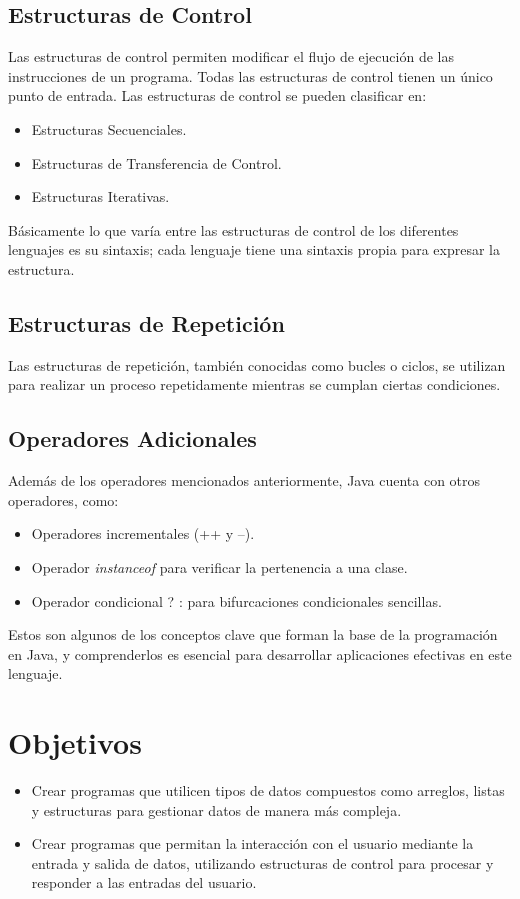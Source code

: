 \documentclass[11pt, twocolumn]{article}
\begin{document}
  \subsection*{Estructuras de Control}
  Las estructuras de control permiten modificar el flujo de ejecución de las instrucciones de un programa. Todas las estructuras de control tienen un único punto de entrada. Las estructuras de control se pueden clasificar en:

  \begin{itemize}
    \item Estructuras Secuenciales.
    \item Estructuras de Transferencia de Control.
    \item Estructuras Iterativas.
  \end{itemize}

  Básicamente lo que varía entre las estructuras de control de los diferentes lenguajes es su sintaxis; cada lenguaje tiene una sintaxis propia para expresar la estructura.

  \subsection*{Estructuras de Repetición}
  Las estructuras de repetición, también conocidas como bucles o ciclos, se utilizan para realizar un proceso repetidamente mientras se cumplan ciertas condiciones.

  \subsection*{Operadores Adicionales}
  Además de los operadores mencionados anteriormente, Java cuenta con otros operadores, como:

  \begin{itemize}
    \item Operadores incrementales (++ y --).
    \item Operador \textit{instanceof} para verificar la pertenencia a una clase.
    \item Operador condicional ? : para bifurcaciones condicionales sencillas.    
  \end{itemize}

  Estos son algunos de los conceptos clave que forman la base de la programación en Java, y comprenderlos es esencial para desarrollar aplicaciones efectivas en este lenguaje.
  
  \section*{Objetivos}
  \begin{itemize}
    \item Crear programas que utilicen tipos de datos compuestos como arreglos, listas y estructuras para gestionar datos de manera más compleja.
    \item Crear programas que permitan la interacción con el usuario mediante la entrada y salida de datos, utilizando estructuras de control para procesar y responder a las entradas del usuario.
  \end{itemize}
\end{document}
